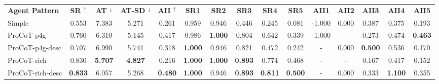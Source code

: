 \setlength{\tabcolsep}{3.1pt} %

\begin{table}[ht]
    \footnotesize
    \centering
    \begin{tabular}{lcccc ccccc ccccc}
        \toprule
                \bf{Agent Pattern} & \bf{SR} $^\uparrow$ & \bf{AT} $^\downarrow$ & \bf{AT-SD} $^\downarrow$ & \bf{AII} $^\uparrow$ & \bf{SR1} & \bf{SR2} & \bf{SR3} & \bf{SR4} & \bf{SR5} & \bf{AII1}  & \bf{AII2} & \bf{AII3}  & \bf{AII4} & \bf{AII5} \\
        \cmidrule(l){1-1} \cmidrule(l){2-5} \cmidrule(l){6-10} \cmidrule(l){11-15}
        Simple & 0.553 & 7.383 & 5.271 & 0.261 & 0.959 & 0.946 & 0.446 & 0.245 & 0.081 & -1.000 & 0.000 & 0.387 & 0.375 & 0.193 \\
        ProCoT-p4g & 0.760 & 6.310 & 5.145 & 0.417 & 0.986 & \bf{1.000} & 0.804 & 0.642 & 0.339 & -1.000 & - & 0.273 & 0.474 & \bf{0.463} \\
        ProCoT-p4g-desc & 0.707 & 6.990 & 5.741 & 0.318 & \bf{1.000} & 0.946 & 0.821 & 0.472 & 0.242 & - & 0.000 & \bf{0.500} & 0.536 & 0.170 \\
        \cmidrule(l){1-1} \cmidrule(l){2-5} \cmidrule(l){6-10} \cmidrule(l){11-15}        ProCoT-rich & 0.830 & \bf{5.707} & \bf{4.827} & 0.216 & \bf{1.000} & \bf{1.000} & \bf{0.893} & 0.774 & 0.468 & - & - & 0.167 & 0.417 & 0.152 \\
        ProCoT-rich-desc & \bf{0.833} & 6.057 & 5.268 & \bf{0.480} & \bf{1.000} & 0.946 & \bf{0.893} & \bf{0.811} & \bf{0.500} & - & 0.000 & 0.333 & \bf{1.100} & 0.355 \\

\end{tabular}
\end{table}
